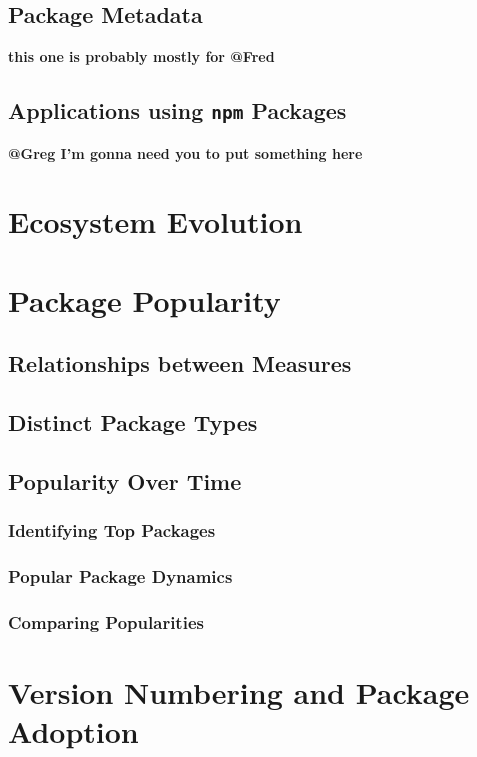 \documentclass[10pt,conference]{IEEEtran}
\def\code#1{\texttt{#1}}
\begin{document}
\subsection{Package Metadata}

\textbf{this one is probably mostly for @Fred}

\subsection{Applications using \code{npm} Packages}

\textbf{@Greg I'm gonna need you to put something here}

\section{Ecosystem Evolution}

\section{Package Popularity}

\subsection{Relationships between Measures}

\subsection{Distinct Package Types}

\subsection{Popularity Over Time}

\subsubsection{Identifying Top Packages}

\subsubsection{Popular Package Dynamics}

\subsubsection{Comparing Popularities}

\section{Version Numbering and Package Adoption}
\end{document}
